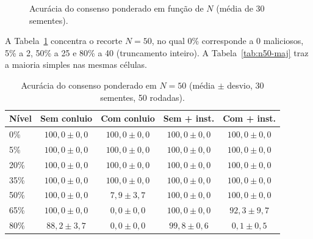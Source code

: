 \documentclass[12pt]{article}
\begin{document}
\begin{figure}[H]
\caption{Acurácia do consenso ponderado em função de $N$ (média de 30 sementes).}
\label{fig:acuracia-n}
\end{figure}

A Tabela~\ref{tab:n50-pond} concentra o recorte $N=50$, no qual 0\% corresponde a 0 maliciosos, 5\% a 2, 50\% a 25 e 80\% a 40 (truncamento inteiro). A Tabela~\ref{tab:n50-maj} traz a maioria simples nas mesmas células.

\begin{table}[htbp]
\centering
\caption{Acurácia do consenso ponderado em $N=50$ (média $\pm$ desvio, 30 sementes, 50 rodadas).}
\label{tab:n50-pond}
\footnotesize
\begin{tabular}{|l|c|c|c|c|}
\hline
\textbf{Nível} & \textbf{Sem conluio} & \textbf{Com conluio} & \textbf{Sem + inst.} & \textbf{Com + inst.} \\
\hline
0\%  & $100{,}0\pm 0{,}0$ & $100{,}0\pm 0{,}0$ & $100{,}0\pm 0{,}0$ & $100{,}0\pm 0{,}0$ \\
5\%  & $100{,}0\pm 0{,}0$ & $100{,}0\pm 0{,}0$ & $100{,}0\pm 0{,}0$ & $100{,}0\pm 0{,}0$ \\
20\% & $100{,}0\pm 0{,}0$ & $100{,}0\pm 0{,}0$ & $100{,}0\pm 0{,}0$ & $100{,}0\pm 0{,}0$ \\
35\% & $100{,}0\pm 0{,}0$ & $100{,}0\pm 0{,}0$ & $100{,}0\pm 0{,}0$ & $100{,}0\pm 0{,}0$ \\
50\% & $100{,}0\pm 0{,}0$ & $7{,}9\pm 3{,}7$   & $100{,}0\pm 0{,}0$ & $100{,}0\pm 0{,}0$ \\
65\% & $100{,}0\pm 0{,}0$ & $0{,}0\pm 0{,}0$   & $100{,}0\pm 0{,}0$ & $92{,}3\pm 9{,}7$ \\
80\% & $88{,}2\pm 3{,}7$  & $0{,}0\pm 0{,}0$   & $99{,}8\pm 0{,}6$  & $0{,}1\pm 0{,}5$ \\
\hline
\end{tabular}
\end{table}
\end{document}
